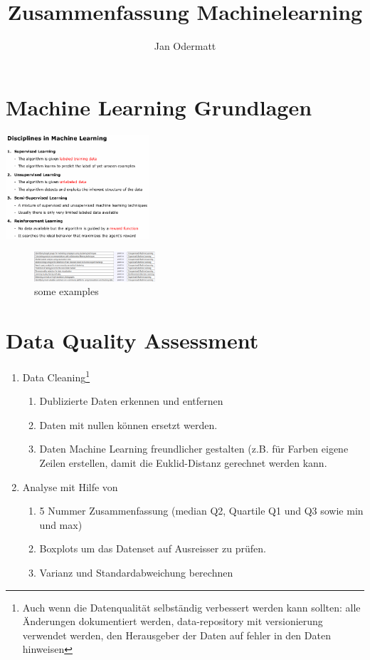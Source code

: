 \documentclass{article}
\author{Jan Odermatt}
\title{Zusammenfassung Machinelearning}
\begin{document}
\tableofcontents
\section{Machine Learning Grundlagen}
\includegraphics[width=0.4\textwidth]{disciplines_in_machine_learning.png}
\begin{figure}[h]
	\includegraphics[width=0.4\textwidth]{disciplines_matched.png}
	\caption{some examples}
\end{figure}
\section{Data Quality Assessment}
	\begin{enumerate}
		\item Data Cleaning\footnote{Auch wenn die Datenqualität selbständig verbessert werden kann sollten: alle Änderungen dokumentiert werden, data-repository mit versionierung verwendet werden, den Herausgeber der Daten auf fehler in den Daten hinweisen}
		\begin{enumerate}
			\item Dublizierte Daten erkennen und entfernen
			\item Daten mit nullen können ersetzt werden.
			\item Daten Machine Learning freundlicher gestalten (z.B. für Farben eigene Zeilen erstellen, damit die Euklid-Distanz gerechnet werden kann.
		\end{enumerate}
		\item Analyse mit Hilfe von
		\begin{enumerate}
		\item 5 Nummer Zusammenfassung (median Q2, Quartile Q1 und Q3 sowie min und max)
		\item Boxplots um das Datenset auf Ausreisser zu prüfen.
		\item Varianz und Standardabweichung berechnen
		\end{enumerate}
	\end{enumerate}
\end{document}
